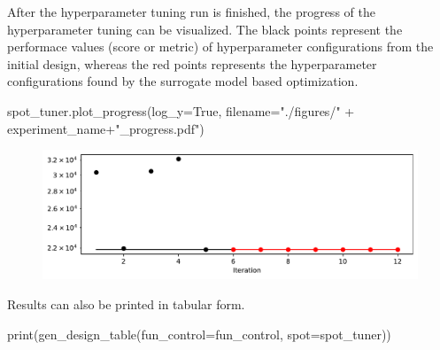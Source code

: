 \documentclass[
  letterpaper,
  DIV=11,
  numbers=noendperiod]{scrreprt}
\newenvironment{Shaded}{\begin{snugshade}}{\end{snugshade}}
\newcommand{\BuiltInTok}[1]{\textcolor[rgb]{0.00,0.23,0.31}{#1}}
\newcommand{\NormalTok}[1]{\textcolor[rgb]{0.00,0.23,0.31}{#1}}
\newcommand{\OperatorTok}[1]{\textcolor[rgb]{0.37,0.37,0.37}{#1}}
\newcommand{\StringTok}[1]{\textcolor[rgb]{0.13,0.47,0.30}{#1}}
\newcommand{\VariableTok}[1]{\textcolor[rgb]{0.07,0.07,0.07}{#1}}
\begin{document}
After the hyperparameter tuning run is finished, the progress of the
hyperparameter tuning can be visualized. The black points represent the
performace values (score or metric) of hyperparameter configurations
from the initial design, whereas the red points represents the
hyperparameter configurations found by the surrogate model based
optimization.

\begin{Shaded}
\begin{Highlighting}[]
\NormalTok{spot\_tuner.plot\_progress(log\_y}\OperatorTok{=}\VariableTok{True}\NormalTok{, filename}\OperatorTok{=}\StringTok{"./figures/"} \OperatorTok{+}\NormalTok{ experiment\_name}\OperatorTok{+}\StringTok{"\_progress.pdf"}\NormalTok{)}
\end{Highlighting}
\end{Shaded}

\begin{figure}[H]

{\centering \includegraphics{024_spot_hpt_river_friedman_hatr_files/figure-pdf/cell-21-output-1.pdf}

}

\end{figure}

Results can also be printed in tabular form.

\begin{Shaded}
\begin{Highlighting}[]
\BuiltInTok{print}\NormalTok{(gen\_design\_table(fun\_control}\OperatorTok{=}\NormalTok{fun\_control, spot}\OperatorTok{=}\NormalTok{spot\_tuner))}
\end{Highlighting}
\end{Shaded}
\end{document}
